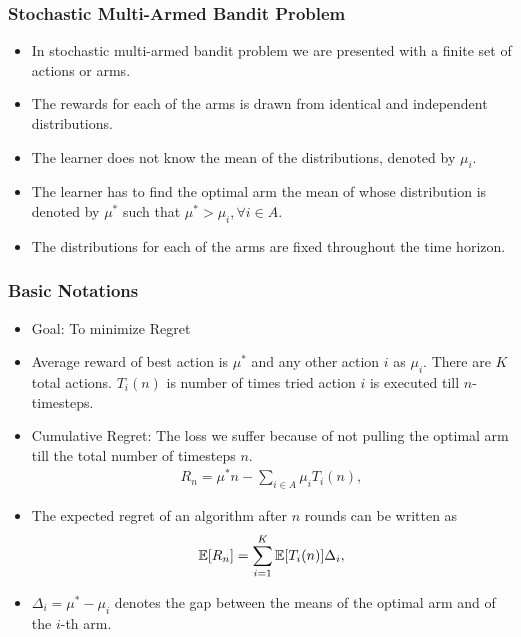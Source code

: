 \begin{frame}
\frametitle{Stochastic Multi-Armed Bandit Problem}
\begin{itemize}
\item<1-> In stochastic multi-armed bandit problem we are presented with a finite set of actions or arms. 
\item<2-> The rewards for each of the arms is drawn from identical and independent distributions. 
\item<3-> The learner does not know the mean of the distributions, denoted by $\mu_{i}$. 
\item<4-> The learner has to find the optimal arm the mean of whose distribution is denoted by $\mu^{*}$ such that $\mu^{*}> \mu_{i}, \forall i\in A$.
\item<5-> The distributions for each of the arms are fixed throughout the time horizon. 
\end{itemize}
\end{frame}

\begin{frame}
\frametitle{Basic Notations}
\begin{itemize}
\item<1-> Goal: To minimize Regret
\item<2->  Average reward of best action is $\mu^{*}$ and any other action $i$ as $\mu_{i}$. There are $K$ total actions. $T_{i}(n)$ is number of times tried action $i$ is executed till $n$-timesteps.
\item<3->  Cumulative Regret: The loss we suffer because of not pulling the optimal arm till the total number of timesteps  $n$. 
\begin{align*}
R_{n}=\mu^{*}n - \sum_{i\in A} \mu_{i}T_{i}(n),
\end{align*}
\item<4->  The expected regret of an algorithm after $n$ rounds can be written as
\begin{align*}
\mathbb{E}[R_{n}]= \sum_{i=1}^K \mathbb{E}[T_{i}(n)] \Delta_i,
\end{align*}
\item<4-> $\Delta_{i}=\mu^{*}-\mu_{i}$ denotes the gap between the means of the optimal arm and of the $i$-th arm. 
\end{itemize}
\end{frame}